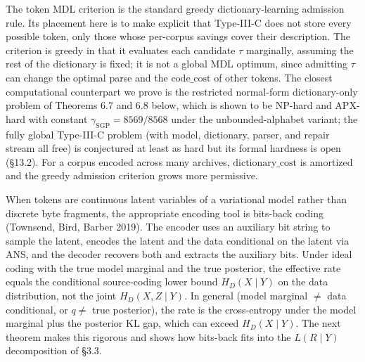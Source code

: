 \documentclass[
]{article}
\begin{document}
The token MDL criterion is the standard greedy dictionary-learning
admission rule. Its placement here is to make explicit that Type-III-C
does not store every possible token, only those whose per-corpus
savings cover their description. The criterion is greedy in that it
evaluates each candidate $\tau$ marginally, assuming the rest of the
dictionary is fixed; it is not a global MDL optimum, since admitting
$\tau$ can change the optimal parse and the
$\mathrm{code\_cost}$ of other tokens. The closest computational
counterpart we prove is the restricted normal-form dictionary-only
problem of Theorems 6.7 and 6.8 below, which is shown to be NP-hard
and APX-hard with constant $\gamma_{\mathrm{SGP}} = 8569/8568$ under
the unbounded-alphabet variant; the fully
global Type-III-C problem (with model, dictionary, parser, and
repair stream all free) is conjectured at least as hard but its
formal hardness is open (§13.2). For a corpus encoded across many
archives,
$\mathrm{dictionary\_cost}$ is amortized and the greedy admission
criterion grows more permissive.

When tokens are continuous latent variables of a variational model
rather than discrete byte fragments, the appropriate encoding tool
is bits-back coding (Townsend, Bird, Barber 2019). The encoder uses
an auxiliary bit string to sample the latent, encodes the latent
and the data conditional on the latent via ANS, and the decoder
recovers both and extracts the auxiliary bits. Under ideal coding
with the true model marginal and the true posterior, the effective
rate equals the conditional source-coding lower bound
$H_D(X \mid Y)$ on the data distribution, not the joint
$H_D(X, Z \mid Y)$. In general (model marginal $\neq$ data
conditional, or $q \neq $ true posterior), the rate is the
cross-entropy under the model marginal plus the posterior KL gap,
which can exceed $H_D(X \mid Y)$. The next theorem makes this
rigorous and shows how bits-back fits into the $L(R \mid Y)$
decomposition of §3.3.
\end{document}
